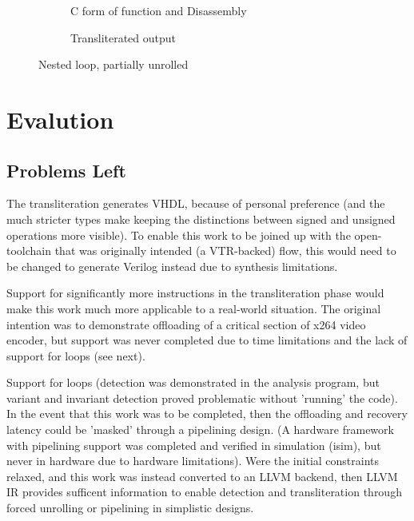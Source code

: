 \documentclass[a4paper]{article}
\begin{document}
\begin{figure}
  \begin{subfigure}[b]{0.5\textwidth}
    
    
    \caption{C form of function and Disassembly}
  \end{subfigure}
  \begin{subfigure}[b]{0.5\textwidth}
    
    \caption{Transliterated output}
  \end{subfigure}
  \caption{Nested loop, partially unrolled}
  \label{fig:loop-partial}
\end{figure}

\section{Evalution}
\subsection{Problems Left}
The transliteration generates VHDL, because of personal preference (and the much stricter types make keeping the distinctions between signed and unsigned operations more visible). To enable this work to be joined up with the open-toolchain that was originally intended (a VTR-backed) flow, this would need to be changed to generate Verilog instead due to synthesis limitations.

Support for significantly more instructions in the transliteration phase would make this work much more applicable to a real-world situation. The original intention was to demonstrate offloading of a critical section of x264 video encoder, but support was never completed due to time limitations and the lack of support for loops (see next).

Support for loops (detection was demonstrated in the analysis program, but variant and invariant detection proved problematic without 'running' the code). In the event that this work was to be completed, then the offloading and recovery latency could be 'masked' through a pipelining design. (A hardware framework with pipelining support was completed and verified in simulation (isim), but never in hardware due to hardware limitations). Were the initial constraints relaxed, and this work was instead converted to an LLVM backend, then LLVM IR provides sufficent information to enable detection and transliteration through forced unrolling or pipelining in simplistic designs.
\end{document}
